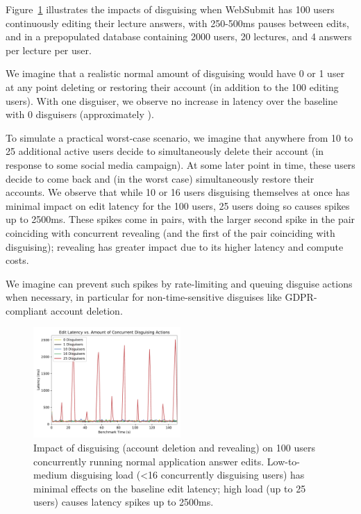  Figure~\ref{fig:concurrent} illustrates the
impacts of disguising when WebSubmit has 100 users continuously editing their lecture answers, with
250-500ms pauses between edits, and in a prepopulated database containing 2000 users, 20 lectures,
and 4 answers per lecture per user.

We imagine that a realistic normal amount of disguising would have 0 or 1 user at any point deleting
or restoring their account (in addition to the 100 editing users). With one disguiser, we observe no
increase in latency over the baseline with 0 disguisers (approximately ). 

To simulate a practical worst-case scenario, we imagine that anywhere from 10 to 25 additional
active users decide to simultaneously delete their account (\eg in response to some social media
campaign). At some later point in time, these users decide to come back and (in the worst case)
simultaneously restore their accounts. We observe that while 10 or 16 users disguising themselves at once
has minimal impact on edit latency for the 100 users, 25 users doing so causes spikes up to 2500ms.  
%
These spikes come in pairs, with the larger second spike in the pair coinciding with concurrent
revealing (and the first of the pair coinciding with disguising); revealing has greater impact due
to its higher latency and compute costs.

We imagine \sys can prevent such spikes by rate-limiting and queuing disguise actions when
necessary, in particular for non-time-sensitive disguises like GDPR-compliant account deletion.


\begin{figure}[t!]
    \centering
        \includegraphics[width=0.5\textwidth]{figs/concurrent_results_20lec_100users}
    \caption{Impact of disguising (account deletion and revealing) on 100 users concurrently running
    normal application answer edits. Low-to-medium disguising load (<16 concurrently disguising users) has
    minimal effects on the baseline edit latency; high load (up to 25 users) causes latency spikes
    up to 2500ms.} 
    \label{fig:concurrent}
\end{figure}
